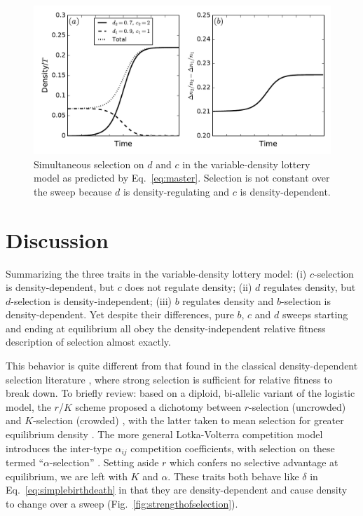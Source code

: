 \documentclass[12pt]{article}
\begin{document}
\begin{figure}
\centering
\includegraphics[scale=0.8]{multiple.pdf}
\caption{\label{fig:multiple} Simultaneous selection on $d$ and $c$ in the variable-density lottery model as predicted by Eq.~\eqref{eq:master}. Selection is not constant over the sweep because $d$ is density-regulating and $c$ is density-dependent.}
\end{figure}

\section*{Discussion}

Summarizing the three traits in the variable-density lottery model: (i) $c$-selection is density-dependent, but $c$ does not regulate density; (ii) $d$ regulates density, but $d$-selection is density-independent; (iii) $b$ regulates density and $b$-selection is density-dependent. Yet despite their differences, pure $b$, $c$ and $d$ sweeps starting and ending at equilibrium all obey the density-independent relative fitness description of selection almost exactly. 

This behavior is quite different from that found in the classical density-dependent selection literature \citep{roughgarden_1979,christiansen_2004}, where strong selection is sufficient for relative fitness to break down. To briefly review: based on a diploid, bi-allelic variant of the logistic model, the $r$/$K$ scheme proposed a dichotomy between $r$-selection (uncrowded) and $K$-selection (crowded) \citep{macarthur_1962}, with the latter taken to mean selection for greater equilibrium density \citep{gill_1974}. The more general Lotka-Volterra competition model introduces the inter-type $\alpha_{ij}$ competition coefficients, with selection on these termed ``$\alpha$-selection'' \citep{gill_1974,joshi_2001}. Setting aside $r$ which confers no selective advantage at equilibrium, we are left with $K$ and $\alpha$. These traits both behave like $\delta$ in Eq.~\eqref{eq:simplebirthdeath} in that they are density-dependent and cause density to change over a sweep (Fig.~\ref{fig:strengthofselection}). 
\end{document}
